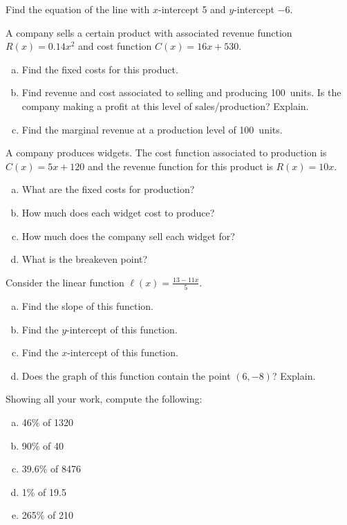 \documentclass[11pt,letterpaper]{article}
\begin{document}
\prob Find the equation of the line with $x$-intercept 5 and $y$-intercept $-6$. \pspace


\prob A company sells a certain product with associated revenue function $R(x)= 0.14x^2$ and cost function $C(x)= 16x + 530$. 
	\begin{enumerate}[(a)]
	\item Find the fixed costs for this product. 
	\item Find revenue and cost associated to selling and producing 100~units. Is the company making a profit at this level of sales/production? Explain. 
	\item Find the marginal revenue at a production level of 100~units. 
	\end{enumerate} \pspace


\prob A company produces widgets. The cost function associated to production is $C(x)= 5x + 120$ and the revenue function for this product is $R(x)= 10x$. 
	\begin{enumerate}[(a)]
	\item What are the fixed costs for production?
	\item How much does each widget cost to produce?
	\item How much does the company sell each widget for?
	\item What is the breakeven point?
	\end{enumerate} \pspace


\prob Consider the linear function $\ell(x)= \frac{13 - 11x}{5}$. 
	\begin{enumerate}[(a)]
	\item Find the slope of this function.
	\item Find the $y$-intercept of this function.
	\item Find the $x$-intercept of this function.
	\item Does the graph of this function contain the point $(6, -8)$? Explain. 
	\end{enumerate} \pspace


\prob Showing all your work, compute the following:
	\begin{enumerate}[(a)]
	\item 46\% of 1320
	\item 90\% of 40
	\item 39.6\% of 8476
	\item 1\% of 19.5
	\item 265\% of 210
	\end{enumerate} \pspace
				
\end{document}
